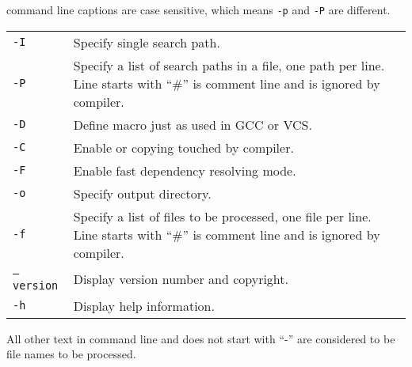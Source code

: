 \mhdlc{} command line captions are case sensitive, which means \texttt{-p} and 
\texttt{-P} are different. 


\tablelasttail{\hline}

\begin{center}
\begin{supertabular}{p{.2\textwidth}p{.7\textwidth}}
\texttt{-I} & 
Specify single search path.\\

\texttt{-P} & 
Specify a list of search paths in a file, one path per line. 
Line starts with ``\#'' is comment line and is ignored by compiler.\\

\texttt{-D} & 
Define macro just as used in GCC or VCS. \\

\texttt{-C} & 
Enable \vlog{} or \sv{} copying touched by compiler. \\

\texttt{-F} & 
Enable fast dependency resolving mode. \\

\texttt{-o} & 
Specify output directory. \\

\texttt{-f} & 
Specify a list of files to be processed, one file per line.  
Line starts with ``\#'' is comment line and is ignored by compiler.\\

\texttt{--version} &
Display version number and copyright.\\

\texttt{-h} & 
Display help information.\\
\hline

\end{supertabular}
\end{center}

All other text in command line and does not start with ``-'' are considered to be file names
to be processed. 

